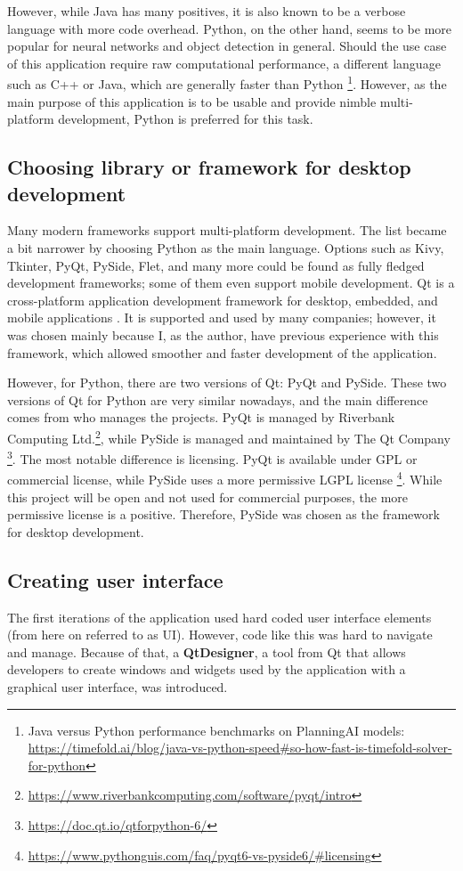 However, while Java has many positives, it is also known to be a verbose language with more code overhead. Python, on the other hand, seems to be more popular for neural networks and object detection in general. Should the use case of this application require raw computational performance, a different language such as C++ or Java, which are generally faster than Python \footnote{Java versus Python performance benchmarks on PlanningAI models: \url{https://timefold.ai/blog/java-vs-python-speed\#so-how-fast-is-timefold-solver-for-python}}. However, as the main purpose of this application is to be usable and provide nimble multi-platform development, Python is preferred for this task. 

\subsection{Choosing library or framework for desktop development}
Many modern frameworks support multi-platform development. The list became a bit narrower by choosing Python as the main language. Options such as Kivy, Tkinter, PyQt, PySide, Flet, and many more could be found as fully fledged development frameworks; some of them even support mobile development. Qt is a cross-platform application development framework for desktop, embedded, and mobile applications \cite{qt}. It is supported and used by many companies; however, it was chosen mainly because I, as the author, have previous experience with this framework, which allowed smoother and faster development of the application.

However, for Python, there are two versions of Qt: PyQt and PySide. These two versions of Qt for Python are very similar nowadays, and the main difference comes from who manages the projects. PyQt is managed by Riverbank Computing Ltd.\footnote{\url{https://www.riverbankcomputing.com/software/pyqt/intro}}, while PySide is managed and maintained by The Qt Company \footnote{\url{https://doc.qt.io/qtforpython-6/}}. The most notable difference is licensing. PyQt is available under GPL or commercial license, while PySide uses a more permissive LGPL license \footnote{\url{https://www.pythonguis.com/faq/pyqt6-vs-pyside6/\#licensing}}. While this project will be open and not used for commercial purposes, the more permissive license is a positive. Therefore, PySide was chosen as the framework for desktop development.

\subsection{Creating user interface}
The first iterations of the application used hard coded user interface elements (from here on referred to as UI). However, code like this was hard to navigate and manage. Because of that, a \textbf{QtDesigner}, a tool from Qt that allows developers to create windows and widgets used by the application with a graphical user interface, was introduced. 

